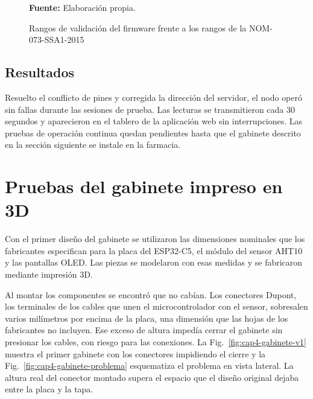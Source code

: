 \begin{figure}[H]
{%
}
\caption{Rangos de validación del firmware frente a los rangos de la NOM-073-SSA1-2015}
\label{fig:cap4-rangos}
\vspace{0.2cm}
\footnotesize \textbf{Fuente:} Elaboración propia.
\end{figure}

\subsection{Resultados}

Resuelto el conflicto de pines y corregida la dirección del servidor, el nodo operó sin fallas durante las sesiones de prueba. Las lecturas se transmitieron cada 30 segundos y aparecieron en el tablero de la aplicación web sin interrupciones. Las pruebas de operación continua quedan pendientes hasta que el gabinete descrito en la sección siguiente se instale en la farmacia.


\clearpage
\section{Pruebas del gabinete impreso en 3D}

Con el primer diseño del gabinete se utilizaron las dimensiones nominales que los fabricantes especifican para la placa del ESP32-C5, el módulo del sensor AHT10 y las pantallas OLED. Las piezas se modelaron con esas medidas y se fabricaron mediante impresión 3D.

Al montar los componentes se encontró que no cabían. Los conectores Dupont, los terminales de los cables que unen el microcontrolador con el sensor, sobresalen varios milímetros por encima de la placa, una dimensión que las hojas de los fabricantes no incluyen. Ese exceso de altura impedía cerrar el gabinete sin presionar los cables, con riesgo para las conexiones. La Fig.~\ref{fig:cap4-gabinete-v1} muestra el primer gabinete con los conectores impidiendo el cierre y la Fig.~\ref{fig:cap4-gabinete-problema} esquematiza el problema en vista lateral. La altura real del conector montado supera el espacio que el diseño original dejaba entre la placa y la tapa.

